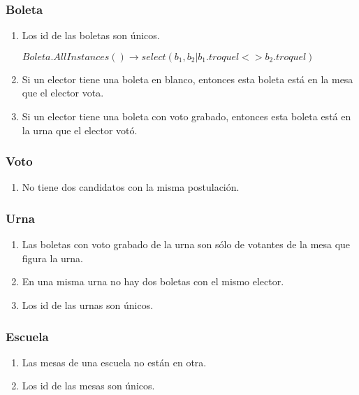 \subsubsection*{Boleta}
\begin{enumerate}
\item Los id de las boletas son únicos.

$Boleta.AllInstances() \rightarrow select(b_1, b_2 | b_1.troquel <> b_2.troquel)$

\item Si un elector tiene una boleta en blanco, entonces esta boleta está en la mesa que el elector vota.

\item Si un elector tiene una boleta con voto grabado, entonces esta boleta está en la urna que el elector vot\'o.


\end{enumerate}


\subsubsection*{Voto}
\begin{enumerate}
\item No tiene dos candidatos con la misma postulación.
\end{enumerate}

\subsubsection*{Urna}
\begin{enumerate}
\item Las boletas con voto grabado de la urna son sólo de votantes de la mesa que figura la urna.
\item En una misma urna no hay dos boletas con el mismo elector.    
\item Los id de las urnas son únicos.
\end{enumerate}

\subsubsection*{Escuela}
\begin{enumerate}
\item Las mesas de una escuela no están en otra.
\item Los id de las mesas son únicos.
\end{enumerate}


